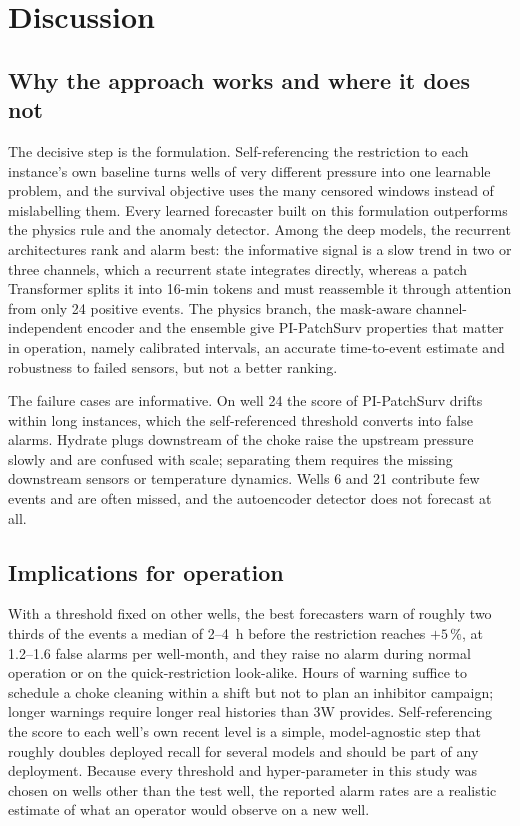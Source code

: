 \section{Discussion}\label{sec:discussion}

\subsection{Why the approach works and where it does not}

The decisive step is the formulation. Self-referencing the restriction to each instance's own baseline
turns wells of very different pressure into one learnable problem, and the survival objective uses the many
censored windows instead of mislabelling them. Every learned forecaster built on this formulation
outperforms the physics rule and the anomaly detector. Among the deep models, the recurrent architectures
rank and alarm best: the informative signal is a slow trend in two or three channels, which a recurrent
state integrates directly, whereas a patch Transformer splits it into 16-min tokens and must reassemble it
through attention from only 24 positive events. The physics branch, the mask-aware channel-independent
encoder and the ensemble give PI-PatchSurv properties that matter in operation, namely calibrated
intervals, an accurate time-to-event estimate and robustness to failed sensors, but not a better ranking.

The failure cases are informative. On well 24 the score of PI-PatchSurv drifts within long instances, which
the self-referenced threshold converts into false alarms. Hydrate plugs downstream of the choke raise the
upstream pressure slowly and are confused with scale; separating them requires the missing downstream
sensors or temperature dynamics. Wells 6 and 21 contribute few events and are often missed, and the
autoencoder detector does not forecast at all.

\subsection{Implications for operation}

With a threshold fixed on other wells, the best forecasters warn of roughly two thirds of the events a median
of 2--4~h before the restriction reaches $+5\,\%$, at 1.2--1.6 false alarms per well-month, and they raise no
alarm during normal operation or on the quick-restriction look-alike. Hours of warning suffice to schedule a
choke cleaning within a shift but not to plan an inhibitor campaign; longer warnings require longer real
histories than 3W provides. Self-referencing the score to each well's own recent level is a simple,
model-agnostic step that roughly doubles deployed recall for several models and should be part of any
deployment. Because every threshold and hyper-parameter in this study was chosen on wells other than the
test well, the reported alarm rates are a realistic estimate of what an operator would observe on a new
well.

